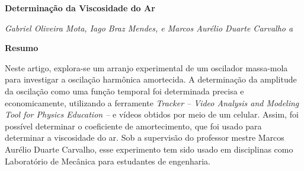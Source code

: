 \documentclass[a4paper, 12pt]{article}
\begin{document}
	\begin{center}
	\begin{large}
		\textbf{Determinação da Viscosidade do Ar}	
	\end{large}
	\end{center}
	
	\begin{center}
		\textit{Gabriel Oliveira Mota, Iago Braz Mendes, e Marcos Aurélio Duarte Carvalho a}
	\end{center}

	\textbf{Resumo}
		
		
		Neste artigo, explora-se um arranjo experimental de um oscilador massa-mola para investigar a oscilação harmônica amortecida. A determinação da amplitude da oscilação como uma função temporal foi determinada precisa e economicamente, utilizando a ferramente \textit{Tracker -- Video Analysis and Modeling Tool for Physics Education --} e vídeos obtidos por meio de um celular. Assim, foi possível determinar o coeficiente de amortecimento, que foi usado para determinar a viscosidade do ar. Sob a supervisão do professor mestre Marcos Aurélio Duarte Carvalho, esse experimento tem sido usado em disciplinas como Laboratório de Mecânica para estudantes de engenharia.
	
\end{document}
